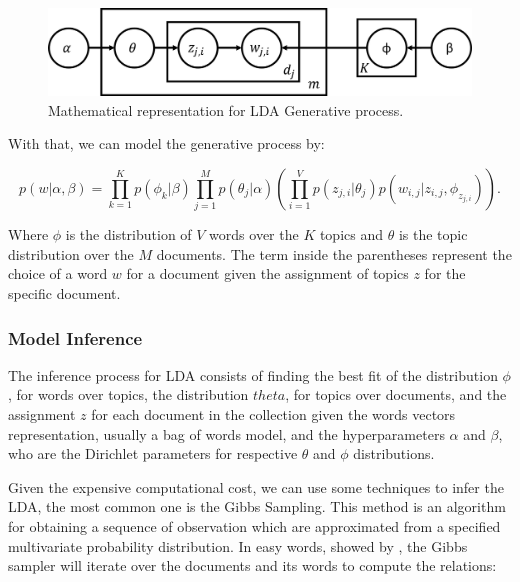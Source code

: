	\begin{figure}[h!]
		\centering
		\includegraphics[width=0.7\linewidth]{01.Chapters/02.Background/generative-probs}
		\caption{Mathematical representation for LDA Generative process.}
		\label{fig:generative-probs}
	\end{figure}
	
	With that, we can model the generative process by: 
	
	\begin{equation}
		\label{eq:generative-lda}
		p(w|\alpha, \beta) = \prod_{k=1}^{K} p(\phi_{k}|\beta) \prod_{j=1}^{M} p(\theta_{j}|\alpha) \left( \prod_{i=1}^{V}p(z_{j,i}|\theta_{j}) p(w_{i,j}|z_{i,j},\phi_{z_{j,i}})  \right) \text{.}
	\end{equation}

	Where $\phi$ is the distribution of $V$ words over the $K$ topics and $\theta$ is the topic distribution over the $M$ documents. The term inside the parentheses represent the choice of a word $w$ for a document given the assignment of topics $z$ for the specific document.
	
	\subsubsection{Model Inference}
	
	The inference process for LDA consists of finding the best fit of the distribution $\phi$, for words over topics, the distribution $theta$, for topics over documents, and the assignment $z$ for each document in the collection given the words vectors representation, usually a bag of words model, and the hyperparameters $\alpha$ and $\beta$, who are the Dirichlet parameters for respective $\theta$ and $\phi$ distributions.
	
	Given the expensive computational cost, we can use some techniques to infer the LDA, the most common one is the Gibbs Sampling. This method is an algorithm for obtaining a sequence of observation which are approximated from a specified multivariate probability distribution. In easy words, showed by , the Gibbs sampler will iterate over the documents and its words to compute the relations:

